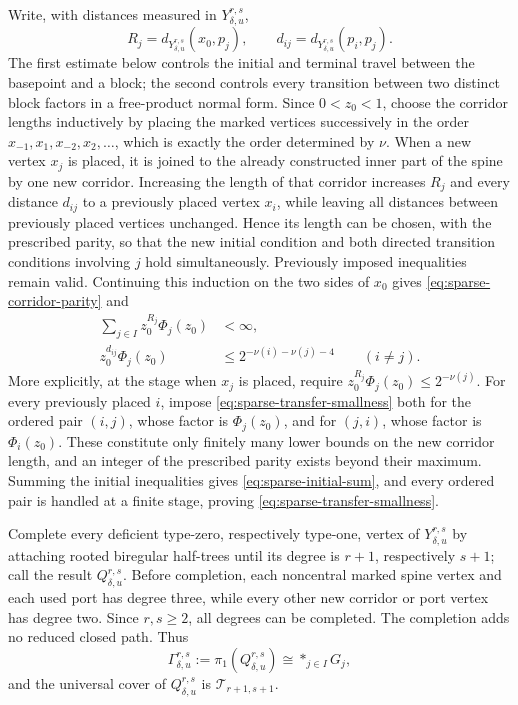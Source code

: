 \documentclass[11pt]{amsart}
\theoremstyle{plain}
\theoremstyle{definition}
\theoremstyle{remark}
\newcommand{\T}{\mathcal T}
\begin{document}
Write, with distances measured in \(Y_{\delta,u}^{r,s}\),
\[
  R_j=d_{Y_{\delta,u}^{r,s}}(x_0,p_j),
  \qquad
  d_{ij}=d_{Y_{\delta,u}^{r,s}}(p_i,p_j).
\]
The first estimate below controls the initial and terminal travel between the
basepoint and a block; the second controls every transition between two
distinct block factors in a free-product normal form.
Since \(0<z_0<1\), choose the corridor lengths inductively by placing
the marked vertices successively in the order
\(x_{-1},x_1,x_{-2},x_2,\ldots\), which is exactly the order determined by
\(\nu\).  When a new vertex \(x_j\) is placed, it is joined to the already
constructed inner part of the spine by one new corridor.  Increasing the
length of that corridor increases \(R_j\) and every distance \(d_{ij}\) to a
previously placed vertex \(x_i\), while leaving all distances between
previously placed vertices unchanged.  Hence its length can be chosen, with
the prescribed parity, so that the new initial condition and both directed
transition conditions involving \(j\) hold simultaneously.  Previously
imposed inequalities remain valid.  Continuing this induction on the two
sides of \(x_0\) gives \eqref{eq:sparse-corridor-parity} and
\begin{align}
  \sum_{j\in I}z_0^{R_j}\Phi_j(z_0)&<\infty,
    \label{eq:sparse-initial-sum}\\
  z_0^{d_{ij}}\Phi_j(z_0)
    &\leq 2^{-\nu(i)-\nu(j)-4}
      \qquad(i\neq j).
    \label{eq:sparse-transfer-smallness}
\end{align}
More explicitly, at the stage when \(x_j\) is placed, require
\(z_0^{R_j}\Phi_j(z_0)\leq2^{-\nu(j)}\).  For every previously placed
\(i\), impose \eqref{eq:sparse-transfer-smallness} both for the ordered pair
\((i,j)\), whose factor is \(\Phi_j(z_0)\), and for \((j,i)\), whose factor
is \(\Phi_i(z_0)\).  These constitute only finitely many lower bounds on the
new corridor length, and an integer of the prescribed parity exists beyond
their maximum.  Summing the initial inequalities gives
\eqref{eq:sparse-initial-sum}, and every ordered pair is handled at a finite
stage, proving \eqref{eq:sparse-transfer-smallness}.

Complete every deficient type-zero, respectively type-one, vertex of
\(Y_{\delta,u}^{r,s}\) by attaching rooted biregular half-trees until its
degree is \(r+1\), respectively \(s+1\); call the result
\(Q_{\delta,u}^{r,s}\).  Before completion, each noncentral marked spine
vertex and each used port has degree three, while every other new corridor
or port vertex has degree two.  Since \(r,s\geq2\), all degrees can be
completed.  The completion adds no reduced closed path.  Thus
\begin{equation}\label{eq:sparse-free-product}
  \Gamma_{\delta,u}^{r,s}:=\pi_1(Q_{\delta,u}^{r,s})
  \cong \mathop{\ast}_{j\in I}G_j,
\end{equation}
and the universal cover of \(Q_{\delta,u}^{r,s}\) is
\(\T_{r+1,s+1}\).
\end{document}
